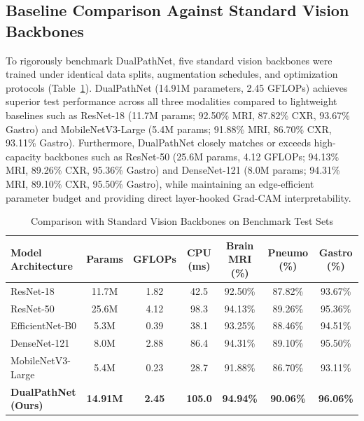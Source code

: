 \documentclass[conference]{IEEEtran}
\begin{document}
\subsection{Baseline Comparison Against Standard Vision Backbones}
To rigorously benchmark DualPathNet, five standard vision backbones were trained under identical data splits, augmentation schedules, and optimization protocols (Table~\ref{tab:baselines}). DualPathNet (14.91M parameters, 2.45 GFLOPs) achieves superior test performance across all three modalities compared to lightweight baselines such as ResNet-18 (11.7M params; 92.50\% MRI, 87.82\% CXR, 93.67\% Gastro) and MobileNetV3-Large (5.4M params; 91.88\% MRI, 86.70\% CXR, 93.11\% Gastro). Furthermore, DualPathNet closely matches or exceeds high-capacity backbones such as ResNet-50 (25.6M params, 4.12 GFLOPs; 94.13\% MRI, 89.26\% CXR, 95.36\% Gastro) and DenseNet-121 (8.0M params; 94.31\% MRI, 89.10\% CXR, 95.50\% Gastro), while maintaining an edge-efficient parameter budget and providing direct layer-hooked Grad-CAM interpretability.

\begin{table}[t]
\caption{Comparison with Standard Vision Backbones on Benchmark Test Sets}
\label{tab:baselines}
\centering
\begin{tabular}{lcccccc}
\toprule
\textbf{Model Architecture} & \textbf{Params} & \textbf{GFLOPs} & \textbf{CPU (ms)} & \textbf{Brain MRI (\%)} & \textbf{Pneumo (\%)} & \textbf{Gastro (\%)} \\
\midrule
ResNet-18 \cite{he2016deep} & 11.7M & 1.82 & 42.5 & 92.50\% & 87.82\% & 93.67\% \\
ResNet-50 \cite{he2016deep} & 25.6M & 4.12 & 98.3 & 94.13\% & 89.26\% & 95.36\% \\
EfficientNet-B0 \cite{tan2019efficientnet} & 5.3M & 0.39 & 38.1 & 93.25\% & 88.46\% & 94.51\% \\
DenseNet-121 \cite{huang2017densely} & 8.0M & 2.88 & 86.4 & 94.31\% & 89.10\% & 95.50\% \\
MobileNetV3-Large \cite{howard2019searching} & 5.4M & 0.23 & 28.7 & 91.88\% & 86.70\% & 93.11\% \\
\textbf{DualPathNet (Ours)} & \textbf{14.91M} & \textbf{2.45} & \textbf{105.0} & \textbf{94.94\%} & \textbf{90.06\%} & \textbf{96.06\%} \\
\bottomrule
\end{tabular}
\end{table}
\end{document}
